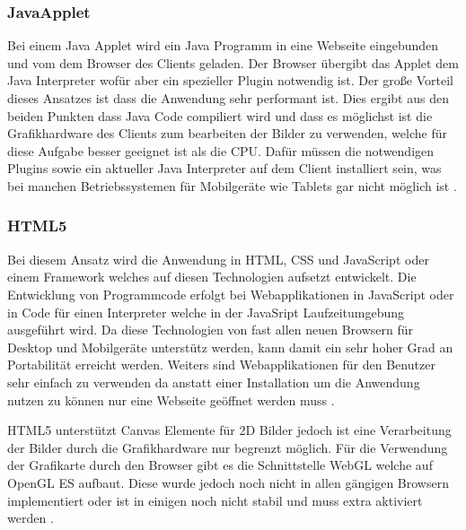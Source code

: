 \subsubsection{JavaApplet}
\label{sec:JavaApplet}
Bei einem Java Applet wird ein Java Programm in eine Webseite eingebunden und vom dem Browser des Clients geladen.
Der Browser übergibt das Applet dem Java Interpreter wofür aber ein spezieller Plugin notwendig ist.
%
Der große Vorteil dieses Ansatzes ist dass die Anwendung sehr performant ist.
Dies ergibt aus den beiden Punkten dass Java Code compiliert wird und dass es möglichst ist die Grafikhardware des Clients zum bearbeiten der Bilder zu verwenden,
welche für diese Aufgabe besser geeignet ist als die CPU.
%
Dafür müssen die notwendigen Plugins sowie ein aktueller Java Interpreter auf dem Client installiert sein, 
was bei manchen Betriebssystemen für Mobilgeräte wie Tablets gar nicht möglich ist \cite{japp}.

\subsubsection{HTML5}
\label{sec:HTML5}
Bei diesem Ansatz wird die Anwendung in HTML, CSS und JavaScript oder einem Framework welches auf diesen Technologien aufsetzt entwickelt.
Die Entwicklung von Programmcode erfolgt bei Webapplikationen in JavaScript oder in Code für einen Interpreter welche in der JavaSript Laufzeitumgebung ausgeführt wird.
Da diese Technologien von fast allen neuen Browsern für Desktop und Mobilgeräte unterstütz werden, kann damit ein sehr hoher Grad an Portabilität erreicht werden.
Weiters sind Webapplikationen für den Benutzer sehr einfach zu verwenden da anstatt einer Installation um die Anwendung nutzen zu können nur eine Webseite geöffnet werden muss \cite{html}.

HTML5 unterstützt Canvas Elemente für 2D Bilder jedoch ist eine Verarbeitung der Bilder durch die Grafikhardware nur begrenzt möglich.
Für die Verwendung der Grafikarte durch den Browser gibt es die Schnittstelle WebGL welche auf OpenGL ES aufbaut.
Diese wurde jedoch noch nicht in allen gängigen Browsern implementiert oder ist in einigen noch nicht stabil und muss extra aktiviert werden \cite{webgl-14}.


